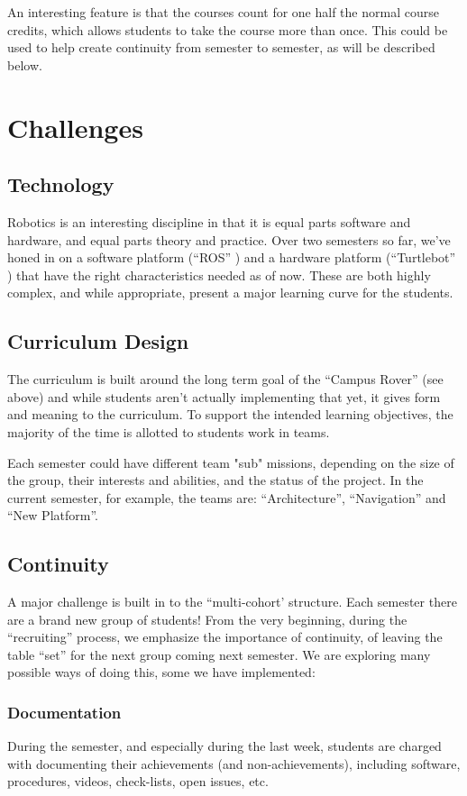 An interesting feature is that the courses count for one half the normal course credits, which allows students to take the course more than once. This could be used to help create continuity from semester to semester, as will be described below.

\section{Challenges}

\subsection{Technology} Robotics is an interesting discipline in that it is equal parts software and hardware, and equal parts theory and practice. Over two semesters so far, we’ve honed in on a software platform (“ROS” \cite{ROS}) and a hardware platform (“Turtlebot” \cite{Turtle}) that have the right characteristics needed as of now. These are both highly complex, and while appropriate, present a major learning curve for the students.

\subsection{Curriculum Design} The curriculum is built around the long term goal of the “Campus Rover” (see above) and while students aren’t actually implementing that yet, it gives form and meaning to the curriculum. To support the intended learning objectives, the majority of the time is allotted to students work in teams. 

Each semester could have different team "sub" missions, depending on the size of the group, their interests and abilities, and the status of the project. In the current semester, for example, the teams are: “Architecture”, “Navigation” and “New Platform”.

\subsection{Continuity}A major challenge is built in to the “multi-cohort’ structure. Each semester there are a brand new group of students! From the very beginning, during the “recruiting” process, we emphasize the importance of continuity, of leaving the table “set” for the next group coming next semester. We are exploring many possible ways of doing this, some we have implemented:
\subsubsection{Documentation}During the semester, and especially during the last week, students are charged with documenting their achievements (and non-achievements), including software, procedures, videos, check-lists, open issues, etc. 
